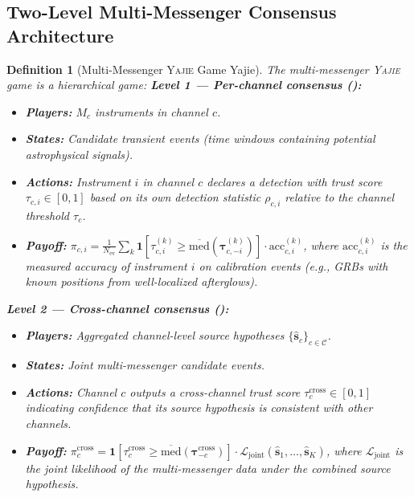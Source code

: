 \documentclass[11pt,a4paper]{article}
\newtheorem{definition}[theorem]{Definition}
\theoremstyle{definition}
\newcommand{\Yajie}{\textsc{Yajie}}
\newcommand{\ind}[1]{\mathbf{1}[#1]}
\begin{document}
\subsection{Two-Level Multi-Messenger Consensus Architecture}
\begin{definition}[Multi-Messenger \Yajie{} Game Yajie]\label{def:yajie_astro}
The multi-messenger \Yajie{} game is a hierarchical game:
\textbf{Level 1 --- Per-channel consensus ():}
\begin{itemize}
    \item \textbf{Players:} $M_c$ instruments in channel $c$.
    \item \textbf{States:} Candidate transient events (time windows containing potential astrophysical signals).
    \item \textbf{Actions:} Instrument $i$ in channel $c$ declares a detection with trust score $\tau_{c,i} \in [0,1]$ based on its own detection statistic $\rho_{c,i}$ relative to the channel threshold $\tau_c$.
    \item \textbf{Payoff:} $\pi_{c,i} = \frac{1}{N_{\mathrm{ev}}}\sum_{k} \ind{\tau_{c,i}^{(k)} \geq \overline{\mathrm{med}}(\boldsymbol{\tau}_{c,-i}^{(k)})} \cdot \mathrm{acc}_{c,i}^{(k)}$, where $\mathrm{acc}_{c,i}^{(k)}$ is the measured accuracy of instrument $i$ on calibration events (e.g., GRBs with known positions from well-localized afterglows).
\end{itemize}
\textbf{Level 2 --- Cross-channel consensus ():}
\begin{itemize}
    \item \textbf{Players:} Aggregated channel-level source hypotheses $\{\hat{\mathbf{s}}_c\}_{c \in \mathcal{C}}$.
    \item \textbf{States:} Joint multi-messenger candidate events.
    \item \textbf{Actions:} Channel $c$ outputs a cross-channel trust score $\tau_c^{\mathrm{cross}} \in [0,1]$ indicating confidence that its source hypothesis is consistent with other channels.
    \item \textbf{Payoff:} $\pi_c^{\mathrm{cross}} = \ind{\tau_c^{\mathrm{cross}} \geq \overline{\mathrm{med}}(\boldsymbol{\tau}_{-c}^{\mathrm{cross}})} \cdot \mathcal{L}_{\mathrm{joint}}(\hat{\mathbf{s}}_1, \ldots, \hat{\mathbf{s}}_K)$, where $\mathcal{L}_{\mathrm{joint}}$ is the joint likelihood of the multi-messenger data under the combined source hypothesis.
\end{itemize}
\end{definition}
\end{document}
